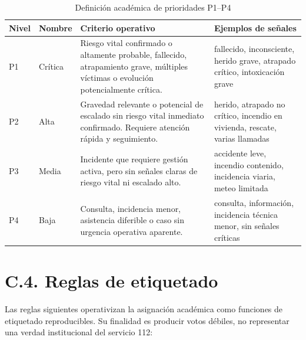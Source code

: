 \begin{table}[ht]
\centering
\caption{Definición académica de prioridades P1--P4}
\label{tab:anexoc-prioridades}
\small
\begin{tabularx}{\textwidth}{|p{1.0cm}|p{2.5cm}|X|X|}
\hline
\textbf{Nivel} & \textbf{Nombre} & \textbf{Criterio operativo} & \textbf{Ejemplos de señales} \\ \hline
P1 & Crítica & Riesgo vital confirmado o altamente probable, fallecido, atrapamiento grave, múltiples víctimas o evolución potencialmente crítica. & fallecido, inconsciente, herido grave, atrapado crítico, intoxicación grave \\ \hline
P2 & Alta & Gravedad relevante o potencial de escalado sin riesgo vital inmediato confirmado. Requiere atención rápida y seguimiento. & herido, atrapado no crítico, incendio en vivienda, rescate, varias llamadas \\ \hline
P3 & Media & Incidente que requiere gestión activa, pero sin señales claras de riesgo vital ni escalado alto. & accidente leve, incendio contenido, incidencia viaria, meteo limitada \\ \hline
P4 & Baja & Consulta, incidencia menor, asistencia diferible o caso sin urgencia operativa aparente. & consulta, información, incidencia técnica menor, sin señales críticas \\ \hline
\end{tabularx}
\end{table}

\section*{C.4. Reglas de etiquetado}

Las reglas siguientes operativizan la asignación académica como funciones de etiquetado
reproducibles. Su finalidad es producir votos débiles, no representar una verdad
institucional del servicio 112:

